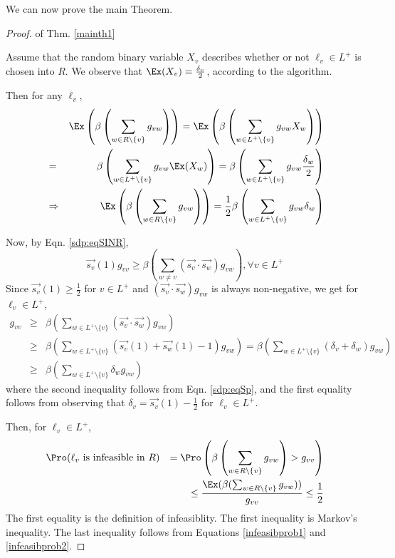\documentclass[11pt]{amsart}
\begin{document}
\noindent We can now prove the main Theorem.

\begin{proof}{of Thm. \ref{mainth1}}





 Assume  that the random binary variable $X_v$ describes whether or not $\ell_v \in L^+$ is chosen into $R$. We observe that
 $\Ex(X_v) = \frac{\delta_v}{2}$, according to the algorithm.
 
 Then for any $\ell_v$,
 \begin{eqnarray}
&&  \Ex\left(\beta\left(\sum_{w \in R \setminus \{v\}} g_{vw}\right)\right) = \Ex\left(\beta\left(\sum_{w \in L^+ \setminus \{v\}} g_{vw} X_w \right)\right) \nonumber \\
& = & \beta\left(\sum_{w \in L^+ \setminus \{v\}} g_{vw} \Ex(X_w) \right) = \beta\left(\sum_{w \in L^+ \setminus \{v\}} g_{vw} \frac{\delta_w}{2} \right) \nonumber \\ 
& \Rightarrow & \Ex\left(\beta\left(\sum_{w \in R \setminus \{v\}} g_{vw}\right)\right) = \frac{1}{2}\beta\left(\sum_{w \in L^+ \setminus \{v\}} g_{vw} \delta_w \right) \label{infeasibprob1}
 \end{eqnarray}
 
Now, by Eqn. \ref{sdp:eqSINR},
$$\vec{s_v}(1) g_{vv} \geq \beta\left(\sum_{w \neq v} (\vec{s_v} \cdot \vec{s_w}) g_{vw}\right), \forall v \in L^+$$
Since $\vec{s_v}(1) \geq \frac{1}{2}$ for $v \in L^+$ and $(\vec{s_v} \cdot \vec{s_w}) g_{vw}$ is always non-negative, we get for $\ell_v \in L^+$,
\begin{eqnarray}
g_{vv} & \geq & \beta\left(\sum_{w \in L^+ \setminus \{v\}} (\vec{s_v} \cdot \vec{s_w}) g_{vw}\right) \nonumber \\
& \geq & \beta\left(\sum_{w \in L^+ \setminus \{v\}} (\vec{s_v}(1) + \vec{s_w}(1) - 1) g_{vw}\right)
= \beta\left(\sum_{w \in L^+ \setminus \{v\}} (\delta_v+ \delta_w) g_{vw}\right) \nonumber \\
& \geq & \beta\left(\sum_{w \in L^+ \setminus \{v\}} \delta_w g_{vw}\right) \label{infeasibprob2}
\end{eqnarray}
where the second inequality follows from Eqn. \ref{sdp:eqSp}, and the first equality follows from observing that $\delta_v = \vec{s_v}(1) - \frac{1}{2}$ for $\ell_v \in L^+$.
 
 Then, for $\ell_v \in L^+$,
\begin{eqnarray}
 \Pro(\ell_v \text{ is infeasible in $R$}) && =  \Pro\left(\beta\left(\sum_{w \in R \setminus \{v\}} g_{vw}\right) > g_{vv}\right) \nonumber \\
&& \leq \frac{\Ex(\beta(\sum_{w \in R \setminus \{v\}}  g_{vw}))}{g_{vv}} \leq \frac{1}{2}
\end{eqnarray}
The first equality is the definition of infeasiblity. The first inequality is Markov's inequality. The last inequality
follows from Equations \ref{infeasibprob1} and \ref{infeasibprob2}.


\end{proof}
\end{document}
